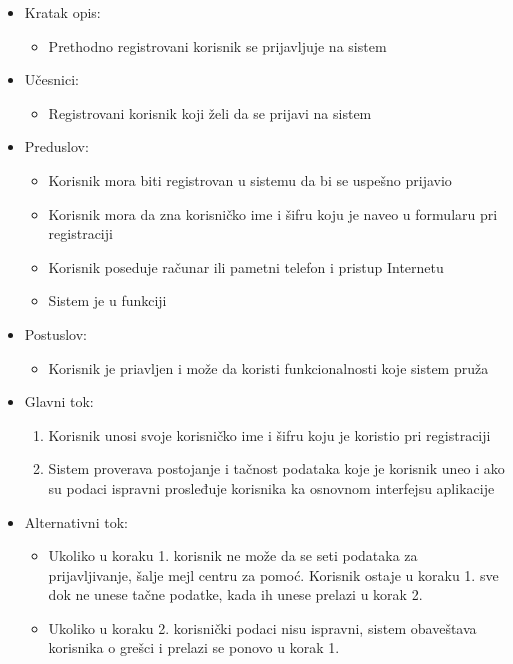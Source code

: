 \documentclass[a4paper]{article}
\begin{document}
\begin{itemize}
    \item Kratak opis:
        \begin{itemize}
            \item Prethodno registrovani korisnik se prijavljuje na sistem
        \end{itemize}
    \item Učesnici:
        \begin{itemize}
            \item Registrovani korisnik koji želi da se prijavi na sistem
        \end{itemize}
    \item Preduslov:
        \begin{itemize}
            \item Korisnik mora biti registrovan u sistemu da bi se uspešno prijavio
            \item Korisnik mora da zna korisničko ime i šifru koju je naveo u formularu pri registraciji
            \item Korisnik poseduje računar ili pametni telefon i pristup Internetu
            \item Sistem je u funkciji
        \end{itemize}
    \item Postuslov:
        \begin{itemize}
            \item Korisnik je priavljen i može da koristi funkcionalnosti koje sistem pruža
        \end{itemize}
    \item Glavni tok:
        \begin{enumerate}
            \item Korisnik unosi svoje korisničko ime i šifru koju je koristio pri registraciji
            \item Sistem proverava postojanje i tačnost podataka koje je korisnik uneo i ako su podaci ispravni prosleđuje korisnika ka osnovnom interfejsu aplikacije
        \end{enumerate}
    \item Alternativni tok:
        \begin{itemize}
            \item Ukoliko u koraku 1. korisnik ne može da se seti podataka za prijavljivanje, šalje mejl centru za pomoć. Korisnik ostaje u koraku 1. sve dok ne unese tačne podatke, kada ih unese prelazi u korak 2.
            \item Ukoliko u koraku 2. korisnički podaci nisu ispravni, sistem obaveštava korisnika o grešci i prelazi se ponovo u korak 1.

\end{itemize}
\end{itemize}
\end{document}
